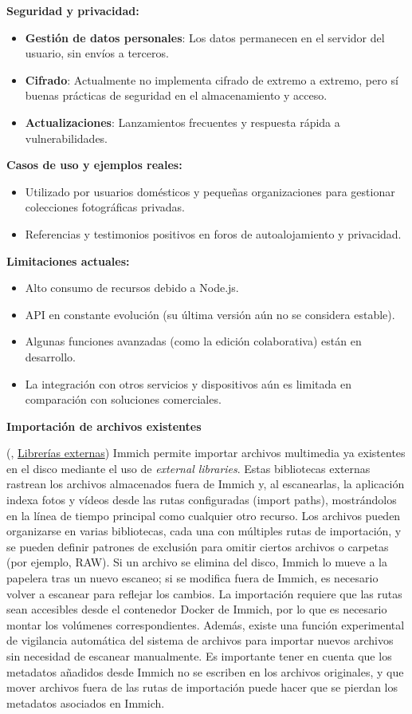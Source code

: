 \textbf{Seguridad y privacidad:}
\begin{itemize}
    \item \textbf{Gestión de datos personales}: Los datos permanecen en el servidor del usuario, sin envíos a terceros.
    \item \textbf{Cifrado}: Actualmente no implementa cifrado de extremo a extremo, pero sí buenas prácticas de seguridad en el almacenamiento y acceso.
    \item \textbf{Actualizaciones}: Lanzamientos frecuentes y respuesta rápida a vulnerabilidades.
\end{itemize}

\textbf{Casos de uso y ejemplos reales:}
\begin{itemize}
    \item Utilizado por usuarios domésticos y pequeñas organizaciones para gestionar colecciones fotográficas privadas.
    \item Referencias y testimonios positivos en foros de autoalojamiento y privacidad.
\end{itemize}

\textbf{Limitaciones actuales:}
\begin{itemize}
    \item Alto consumo de recursos debido a Node.js.
    \item API en constante evolución (su última versión aún no se considera estable).
    \item Algunas funciones avanzadas (como la edición colaborativa) están en desarrollo.
    \item La integración con otros servicios y dispositivos aún es limitada en comparación con soluciones comerciales.
\end{itemize}

\textbf{Importación de archivos existentes}

(\cite{immich-documentation}, \href{https://immich.app/docs/features/libraries/}{Librerías externas}) Immich permite importar archivos multimedia ya existentes en el disco mediante el uso de \textit{external libraries}. Estas bibliotecas externas rastrean los archivos almacenados fuera de Immich y, al escanearlas, la aplicación indexa fotos y vídeos desde las rutas configuradas (import paths), mostrándolos en la línea de tiempo principal como cualquier otro recurso. Los archivos pueden organizarse en varias bibliotecas, cada una con múltiples rutas de importación, y se pueden definir patrones de exclusión para omitir ciertos archivos o carpetas (por ejemplo, RAW). Si un archivo se elimina del disco, Immich lo mueve a la papelera tras un nuevo escaneo; si se modifica fuera de Immich, es necesario volver a escanear para reflejar los cambios. La importación requiere que las rutas sean accesibles desde el contenedor Docker de Immich, por lo que es necesario montar los volúmenes correspondientes. Además, existe una función experimental de vigilancia automática del sistema de archivos para importar nuevos archivos sin necesidad de escanear manualmente. Es importante tener en cuenta que los metadatos añadidos desde Immich no se escriben en los archivos originales, y que mover archivos fuera de las rutas de importación puede hacer que se pierdan los metadatos asociados en Immich.

